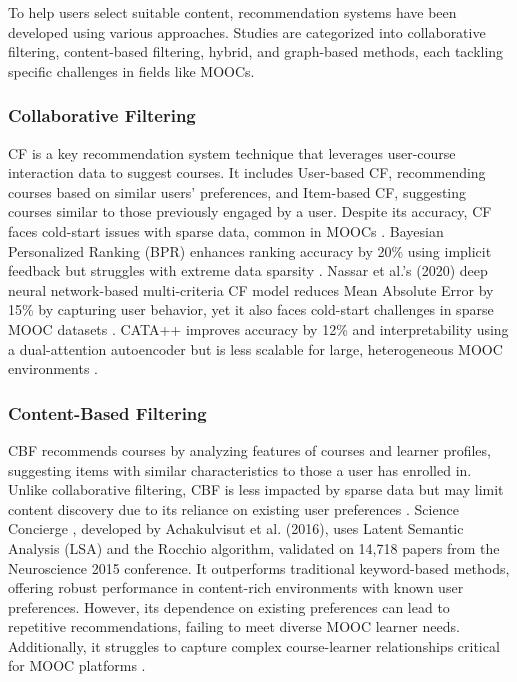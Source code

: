 \documentclass{ieeeaccess}
\begin{document}
To help users select suitable content, recommendation systems have been developed using various approaches. Studies are categorized into collaborative filtering, content-based filtering, hybrid, and graph-based methods, each tackling specific challenges in fields like MOOCs.

\subsubsection{Collaborative Filtering}

CF is a key recommendation system technique that leverages user-course interaction data to suggest courses. It includes User-based CF, recommending courses based on similar users' preferences, and Item-based CF, suggesting courses similar to those previously engaged by a user. Despite its accuracy, CF faces cold-start issues with sparse data, common in MOOCs \cite{aggarwal2016recommender}. Bayesian Personalized Ranking (BPR) \cite{rendle2012bprmf} enhances ranking accuracy by 20\% using implicit feedback but struggles with extreme data sparsity \cite{kizilcec2015attrition_missing_MOOC}. Nassar et al.'s (2020) deep neural network-based multi-criteria CF model \cite{nassar2020novel} reduces Mean Absolute Error by 15\% by capturing user behavior, yet it also faces cold-start challenges in sparse MOOC datasets \cite{jordan2014initial_trend_mooc}. CATA++ \cite{alfarhood2020cata++} improves accuracy by 12\% and interpretability using a dual-attention autoencoder but is less scalable for large, heterogeneous MOOC environments \cite{yu2021mooccubex}.

\subsubsection{Content-Based Filtering}

CBF recommends courses by analyzing features of courses and learner profiles, suggesting items with similar characteristics to those a user has enrolled in. Unlike collaborative filtering, CBF is less impacted by sparse data but may limit content discovery due to its reliance on existing user preferences \cite{aggarwal2016recommender}. Science Concierge \cite{achakulvisut2016science}, developed by Achakulvisut et al. (2016), uses Latent Semantic Analysis (LSA) and the Rocchio algorithm, validated on 14,718 papers from the Neuroscience 2015 conference. It outperforms traditional keyword-based methods, offering robust performance in content-rich environments with known user preferences. However, its dependence on existing preferences can lead to repetitive recommendations, failing to meet diverse MOOC learner needs. Additionally, it struggles to capture complex course-learner relationships critical for MOOC platforms \cite{qaffas2020towards, mustafeez2024comprehensive}.
\end{document}
